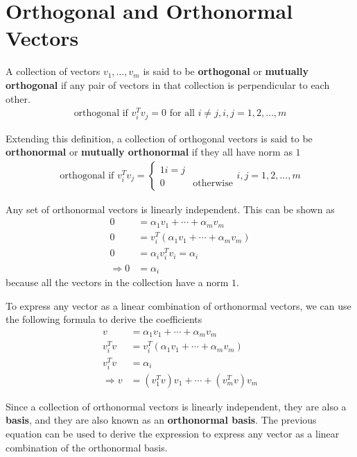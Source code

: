 \documentclass[../../linear_algebra.tex]{subfiles}
\begin{document}
\section{Orthogonal and Orthonormal Vectors}
A collection of vectors $v_{1}, \ldots, v_{m}$ is said to be \textbf{orthogonal} or \textbf{mutually orthogonal} if any pair of vectors in that collection is perpendicular to each other.
\begin{align*}
    \text{orthogonal if } v_{i}^{T}v_{j} = 0 \text{ for all } i \neq j, i,j = 1,2,\ldots, m
\end{align*}

Extending this definition, a collection of orthogonal vectors is said to be \textbf{orthonormal} or \textbf{mutually orthonormal} if they all have norm as $1$
\begin{align*}
    \text{orthogonal if } v_{i}^{T}v_{j} = \begin{cases} 1 \mbox{$i = j$}\\ 0 &\mbox{otherwise} \end{cases} i,j = 1,2,\ldots, m
\end{align*}

Any set of orthonormal vectors is linearly independent. This can be shown as
\begin{align*}
    0 &= \alpha_{1}v_{1} + \cdots + \alpha_{m}v_{m}\\
    0 &= v_{i}^{T}(\alpha_{1}v_{1} + \cdots + \alpha_{m}v_{m})\\
    0 &= \alpha_{i}v_{i}^{T}v_{i} = \alpha_{i}\\
    \Rightarrow 0 &= \alpha_{i}
\end{align*}
because all the vectors in the collection have a norm $1$.\newline

To express any vector as a linear combination of orthonormal vectors, we can use the following formula to derive the coefficients
\begin{align*}
    v &= \alpha_{1}v_{1} + \cdots + \alpha_{m}v_{m}\\
    v_{i}^{T}v &= v_{i}^{T}(\alpha_{1}v_{1} + \cdots + \alpha_{m}v_{m})\\
    v_{i}^{T}v &= \alpha_{i}\\
    \Rightarrow v &= (v_{1}^{T}v)v_{1} + \cdots + (v_{m}^{T}v)v_{m}
\end{align*}

Since a collection of orthonormal vectors is linearly independent, they are also a \textbf{basis}, and they are also known as an \textbf{orthonormal basis}. The previous equation can be used to derive the expression to express any vector as a linear combination of the orthonormal basis.
\end{document}
